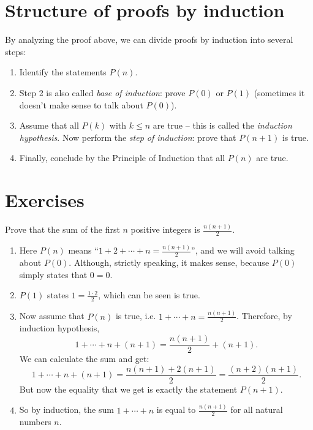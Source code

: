 \section{Structure of proofs by induction}

By analyzing the proof above, we can divide proofs by induction into several steps:
\begin{enumerate}
\item Identify the statements $P(n)$.
\item Step 2 is also called \emph{base of induction}: prove $P(0)$ or $P(1)$ (sometimes it doesn't make sense to talk about $P(0)$).
\item Assume that all $P(k)$ with $k\leq n$ are true -- this is called the \emph{induction hypothesis}. Now perform the \emph{step of induction}: prove that $P(n+1)$ is true.
\item Finally, conclude by the Principle of Induction that all $P(n)$ are true.
\end{enumerate}



\section{Exercises}

\begin{example}
Prove that the sum of the first $n$ positive integers is $\frac{n(n+1)}{2}$.
\begin{enumerate}
\item 
Here $P(n)$ means ``$1+2+\cdots+n = \frac{n(n+1)}{2}$'', and we will avoid talking about $P(0)$. Although, strictly speaking, it makes sense, because $P(0)$ simply states that $0=0$.
\item 
$P(1)$ states $1 = \frac{1\cdot2}{2}$, which can be seen is true.
\item 
Now assume that $P(n)$ is true, i.e. $1 + \cdots + n = \frac{n(n+1)}{2}$. Therefore, by induction hypothesis,
$$ 1 + \cdots + n + (n+1) = \frac{n(n+1)}{2} + (n+1)
.$$
We can calculate the sum and get:
$$ 1 + \cdots + n + (n+1) = \frac{n(n+1) + 2(n+1)}{2} =
\frac{(n+2)(n+1)}{2}
.$$
But now the equality that we get is exactly the statement $P(n+1)$.
\item
So by induction, the sum $1+ \cdots + n$ is equal to $\frac{n(n+1)}{2}$ for all natural numbers $n$.
\end{enumerate}
\end{example}

